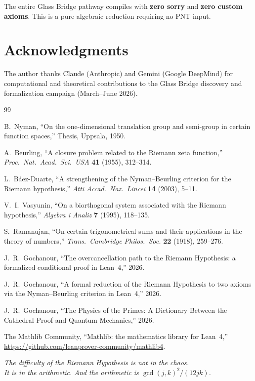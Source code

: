 \documentclass[11pt,a4paper]{article}
\begin{document}
\noindent
The entire Glass Bridge pathway compiles with \textbf{zero sorry}
and \textbf{zero custom axioms}. This is a pure algebraic
reduction requiring no PNT input.

\section*{Acknowledgments}

The author thanks Claude (Anthropic) and Gemini (Google DeepMind)
for computational and theoretical contributions to the Glass Bridge
discovery and formalization campaign (March--June 2026).

\begin{thebibliography}{99}

B.~Nyman,
``On the one-dimensional translation group and semi-group in certain
function spaces,''
Thesis, Uppsala, 1950.

A.~Beurling,
``A closure problem related to the Riemann zeta function,''
\emph{Proc.\ Nat.\ Acad.\ Sci.\ USA} \textbf{41} (1955), 312--314.

L.~B\'aez-Duarte,
``A strengthening of the Nyman--Beurling criterion for the Riemann
hypothesis,''
\emph{Atti Accad.\ Naz.\ Lincei} \textbf{14} (2003), 5--11.

V.~I.~Vasyunin,
``On a biorthogonal system associated with the Riemann hypothesis,''
\emph{Algebra i Analiz} \textbf{7} (1995), 118--135.

S.~Ramanujan,
``On certain trigonometrical sums and their applications in the
theory of numbers,''
\emph{Trans.\ Cambridge Philos.\ Soc.} \textbf{22} (1918), 259--276.

J.~R.~Gochanour,
``The overcancellation path to the Riemann Hypothesis:
a formalized conditional proof in Lean~4,''
2026.

J.~R.~Gochanour,
``A formal reduction of the Riemann Hypothesis to two axioms
via the Nyman--Beurling criterion in Lean~4,''
2026.

J.~R.~Gochanour,
``The Physics of the Primes: A Dictionary Between the Cathedral
Proof and Quantum Mechanics,''
2026.

The Mathlib Community,
``Mathlib: the mathematics library for Lean~4,''
\url{https://github.com/leanprover-community/mathlib4}.

\end{thebibliography}

\vfill
\begin{center}
\itshape
The difficulty of the Riemann Hypothesis is not in the chaos.\\
It is in the arithmetic. And the arithmetic is
$\gcd(j,k)^2/(12jk)$.
\end{center}
\end{document}
